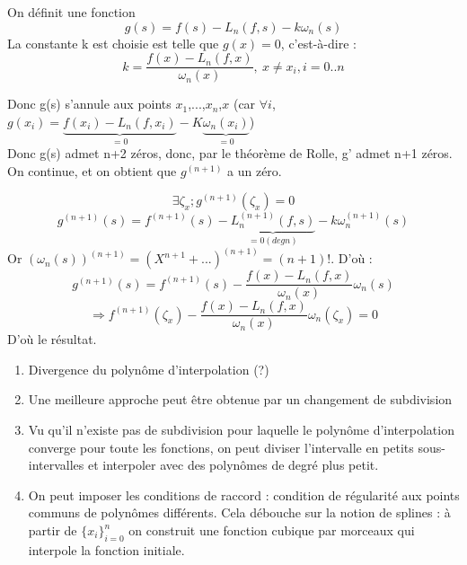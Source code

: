 \begin{dem}
	On définit une fonction \[g(s)=f(s)-L_n(f,s)-k\omega_n(s)\]
	La constante k est choisie est telle que $g(x)=0$, c'est-à-dire :
	\[k=\frac{f(x)-L_n(f,x)}{\omega_n(x)},\ x\neq x_i, i=0..n\]
	
	Donc g(s) s'annule aux points $x_1$,...,$x_n$,$x$ (car $\forall i$, $g(x_i)=\underbrace{f(x_i)-L_n(f,x_i)}_{=0}-K\underbrace{\omega_n(x_i)}_{=0}$)\\

	Donc g(s) admet n+2 zéros, donc, par le théorème de Rolle, g' admet n+1 zéros.\\
	On continue, et on obtient que $g^{(n+1)}$ a un zéro. 

	\[\exists \zeta_x ; g^{(n+1)}(\zeta_x)=0\]
	\[g^{(n+1)}(s)=f^{(n+1)}(s)-\underbrace{L_n^{(n+1)}(f,s)}_{=0 (deg n)}-k\omega_n^{(n+1)}(s)\]
	Or $(\omega_n(s))^{(n+1)}=(X^{n+1}+...)^{(n+1)}=(n+1)!$. D'où : 
	\[g^{(n+1)}(s)=f^{(n+1)}(s)-\frac{f(x)-L_n(f,x)}{\omega_n(x)}\omega_n(s)\]
	\[\Rightarrow f^{(n+1)}(\zeta_x)-\frac{f(x)-L_n(f,x)}{\omega_n(x)}\omega_n(\zeta_x)=0\]
	D'où le résultat.
	
\end{dem}


\begin{rmq}
\begin{enumerate}
\item Divergence du polynôme d'interpolation (?)
\item Une meilleure approche peut être obtenue par un changement de subdivision
\item Vu qu'il n'existe pas de subdivision pour laquelle le polynôme d'interpolation converge pour toute les fonctions, on peut diviser l'intervalle en petits sous-intervalles et interpoler avec des polynômes de degré plus petit.
\item On peut imposer les conditions de raccord : condition de régularité aux points communs de polynômes différents. Cela débouche sur la notion de splines : à partir de $\{x_i\}_{i=0}^n$ on construit une fonction cubique par morceaux qui interpole la fonction initiale. 
\end{enumerate}
\end{rmq}



